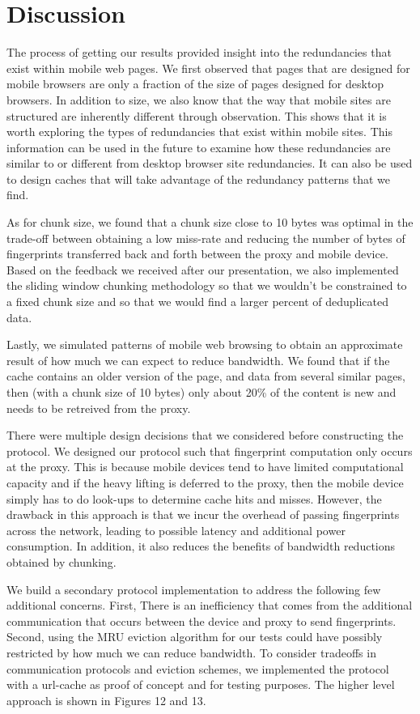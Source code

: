 \section{Discussion}
\label{sec:discussion}
The process of getting our results provided insight into the redundancies that exist within mobile web pages. We first observed that pages that are designed for mobile browsers are only a fraction of the size of pages designed for desktop browsers. In addition to size, we also know that the way that mobile sites are structured are inherently different through observation. This shows that it is worth exploring the types of redundancies that exist within mobile sites. This information can be used in the future to examine how these redundancies are similar to or different from desktop browser site redundancies. It can also be used to design caches that will take advantage of the redundancy patterns that we find. 

As for chunk size, we found that a chunk size close to 10 bytes was optimal in the trade-off between obtaining a low miss-rate and reducing the number of bytes of fingerprints transferred back and forth between the proxy and mobile device. Based on the feedback we received after our presentation, we also implemented the sliding window chunking methodology so that we wouldn't be constrained to a fixed chunk size and so that we would find a larger percent of deduplicated data. 

Lastly, we simulated patterns of mobile web browsing to obtain an approximate result of how much we can expect to reduce bandwidth. We found that if the cache contains an older version of the page, and data from several similar pages, then (with a chunk size of 10 bytes) only about 20\% of the content is new and needs to be retreived from the proxy. 

There were multiple design decisions that we considered before constructing the protocol. We designed our protocol such that fingerprint computation only occurs at the proxy. This is because mobile devices tend to have limited computational capacity and if the heavy lifting is deferred to the proxy, then the mobile device simply has to do look-ups to determine cache hits and misses. However, the drawback in this approach is that we incur the overhead of passing fingerprints across the network, leading to possible latency and additional power consumption. In addition, it also reduces the benefits of bandwidth reductions obtained by chunking.

We build a secondary protocol implementation to address the following few additional concerns. First, There is an inefficiency that comes from the additional communication that occurs between the device and proxy to send fingerprints. Second, using the MRU eviction algorithm for our tests could have possibly restricted by how much we can reduce bandwidth. To consider tradeoffs in communication protocols and eviction schemes, we implemented the protocol with a url-cache as proof of concept and for testing purposes. The higher level approach is shown in Figures 12 and 13. 

